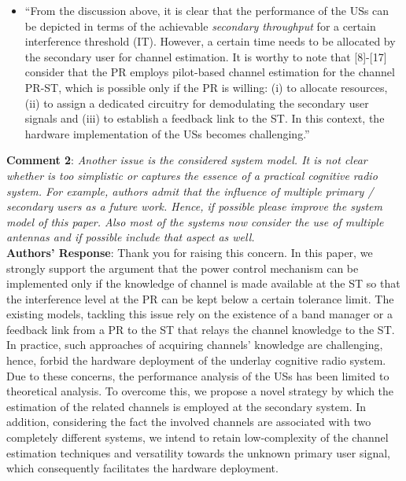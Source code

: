 \documentclass[12pt,a4wide,peerreview]{IEEEtran}
\begin{document}
\begin{itemize}
\item ``From the discussion above, it is clear that the performance of the USs can be depicted in terms of the achievable \textit{secondary throughput} for a certain interference threshold (IT). However, a certain time needs to be allocated by the secondary user for channel estimation. It is worthy to note that [8]-[17] consider that the PR employs pilot-based channel estimation for the channel PR-ST, which is possible only if the PR is willing: (i) to allocate resources, (ii) to assign a dedicated circuitry for demodulating the secondary user signals and (iii) to establish a feedback link to the ST. In this context, the hardware implementation of the USs becomes challenging.''
\end{itemize}
\textbf{Comment 2}: 
\textit{
Another issue is the considered system model. It is not clear whether is too simplistic or captures the essence of a practical cognitive radio system. For example, authors admit that the influence of multiple primary / secondary users as a future work. Hence, if possible please improve the system model of this paper. Also most of the systems now consider the use of multiple antennas and if possible include that aspect as well.
}
\\
\textbf{Authors' Response}: 
Thank you for raising this concern. In this paper, we strongly support the argument that the power control mechanism can be implemented only if the knowledge of channel is made available at the ST so that the interference level at the PR can be kept below a certain tolerance limit. The existing models, tackling this issue rely on the existence of a band manager or a feedback link from a PR to the ST that relays the channel knowledge to the ST. In practice, such approaches of acquiring channels' knowledge are challenging, hence, forbid the hardware deployment of the underlay cognitive radio system. Due to these concerns, the performance analysis of the USs has been limited to theoretical analysis. To overcome this, we propose a novel strategy by which the estimation of the related channels is employed at the secondary system. 
In addition, considering the fact the involved channels are associated with two completely different systems, we intend to retain low-complexity of the channel estimation techniques and versatility towards the unknown primary user signal, which consequently facilitates the hardware deployment. %
\end{document}
